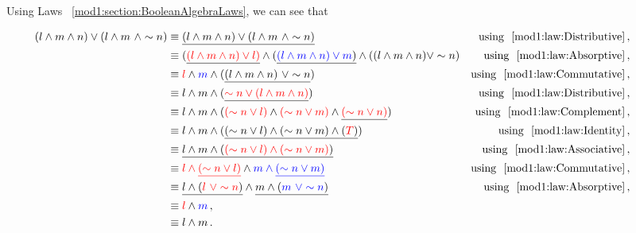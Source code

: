 \begin{subquestions}
\subquestion

Using Laws ~\ref{mod1:section:BooleanAlgebraLaws}, we can see that

\begin{align*}
	\hspace{-10mm}
	(l \land m \land n) \lor (l \land m ~\land \sim n) & \equiv \underline{(l \land m \land n) \lor (l \land m ~\land \sim n)}
	& \text{using ~\ref{mod1:law:Distributive}}\,, \nn \\ 
	 												  & \equiv (\underline{\textcolor{red}{(l \land m \land n) \lor l)}} \land (\underline{\textcolor{blue}{(l \land m \land n) \lor m})} \land ((l \land m    \land n) \lor \sim n)
    & \text{using ~\ref{mod1:law:Absorptive}}\,, \nn \\ 
													  & \equiv \textcolor{red}{l} \land \textcolor{blue}{m} \land (\underline{(l \land m \land n) ~\lor \sim n})
	& \text{using ~\ref{mod1:law:Commutative}}\,, \nn \\ 
													  & \equiv l \land m \land (\underline{\textcolor{red}{\sim n \lor (l \land m \land n)}})
  	& \text{using ~\ref{mod1:law:Distributive}}\,, \nn \\
  													  & \equiv l \land m \land (\textcolor{red}{(\sim n \lor l)} \land \textcolor{red}{(\sim n \lor m)} \land \underline{\textcolor{red}{(\sim n \lor n)}})
    & \text{using ~\ref{mod1:law:Complement}}\,, \nn \\
    										    	  & \equiv l \land m \land (\underline{(\sim n \lor l) \land (\sim n \lor m) \land (\textcolor{red}{T})})
    & \text{using ~\ref{mod1:law:Identity}}\,, \nn \\    
    										    	  & \equiv \underline{l \land m \land (\textcolor{red}{(\sim n \lor l) \land (\sim n \lor m)})}
    & \text{using ~\ref{mod1:law:Associative}}\,, \nn \\  
    												  & \equiv \textcolor{red}{l \land \underline{(\sim n \lor l)}} \land \textcolor{blue}{m \land \underline{(\sim n \lor m)}}
    & \text{using ~\ref{mod1:law:Commutative}}\,, \nn \\     
    				    	    					  & \equiv \underline{l \land (\textcolor{red}{l ~\lor \sim n})} \land \underline{m \land (\textcolor{blue}{m ~\lor \sim n})}
    & \text{using ~\ref{mod1:law:Absorptive}}\,, \nn \\ 	
    												  & \equiv \textcolor{red}{l} \land \textcolor{blue}{m}\,, \\	
													  & \equiv l \land m\,. \\							  			    	    					  				 											
\end{align*}


\end{subquestions}

